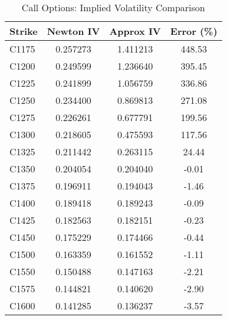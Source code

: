 \documentclass{article}
\begin{document}
\begin{table}[htbp]
\centering
\caption{Call Options: Implied Volatility Comparison}
\label{tab:call_iv}
\begin{tabular}{l S[table-format=1.6] S[table-format=1.6] S[table-format=-1.6]}
\toprule
Strike & {Newton IV} & {Approx IV} & {Error (\%)} \\
\midrule
C1175 & 0.257273 & 1.411213 & 448.53 \\
C1200 & 0.249599 & 1.236640 & 395.45 \\
C1225 & 0.241899 & 1.056759 & 336.86 \\
C1250 & 0.234400 & 0.869813 & 271.08 \\
C1275 & 0.226261 & 0.677791 & 199.56 \\
C1300 & 0.218605 & 0.475593 & 117.56 \\
C1325 & 0.211442 & 0.263115 & 24.44 \\
C1350 & 0.204054 & 0.204040 & -0.01 \\
C1375 & 0.196911 & 0.194043 & -1.46 \\
C1400 & 0.189418 & 0.189243 & -0.09 \\
C1425 & 0.182563 & 0.182151 & -0.23 \\
C1450 & 0.175229 & 0.174466 & -0.44 \\
C1500 & 0.163359 & 0.161552 & -1.11 \\
C1550 & 0.150488 & 0.147163 & -2.21 \\
C1575 & 0.144821 & 0.140620 & -2.90 \\
C1600 & 0.141285 & 0.136237 & -3.57 \\
\bottomrule
\end{tabular}
\end{table}
\end{document}

